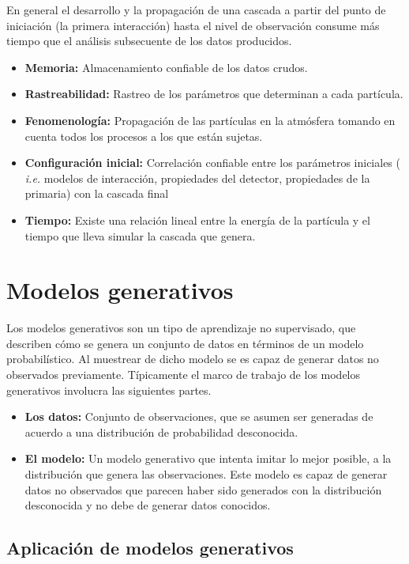 En general el desarrollo y la propagación de una cascada a partir del punto de iniciación (la primera interacción) hasta  el nivel de observación consume más tiempo que el análisis subsecuente de los datos producidos.

\begin{itemize}
    \item \textbf{Memoria:} Almacenamiento confiable de los datos crudos.
    \item \textbf{Rastreabilidad:} Rastreo de los parámetros que determinan a cada partícula.
    \item \textbf{Fenomenología:} Propagación de las partículas en la atmósfera tomando en cuenta todos los procesos a los que están sujetas.
    \item \textbf{Configuración inicial:} Correlación confiable entre los parámetros iniciales ( \emph{i.e.} modelos de interacción, propiedades del detector, propiedades de la primaria) con la cascada final
    \item \textbf{Tiempo:} Existe una relación lineal entre la energía de la partícula y el tiempo que lleva simular la cascada que genera.
\end{itemize}

\section{Modelos generativos}

Los modelos generativos son un tipo de aprendizaje no supervisado, que describen cómo se genera un conjunto de datos en términos de un modelo probabilístico. Al muestrear de dicho modelo se es capaz de generar datos no observados previamente. Típicamente el marco de trabajo de los modelos generativos involucra las siguientes partes.

\begin{itemize}
    \item \textbf{Los datos:} Conjunto de observaciones, que se asumen ser generadas de acuerdo a una distribución de probabilidad desconocida.
    \item \textbf{El modelo:} Un modelo generativo que intenta imitar lo mejor posible, a la distribución que genera las observaciones. Este modelo es capaz de generar datos no observados que parecen haber sido generados con la distribución desconocida y no debe de generar datos conocidos.
\end{itemize}

\subsection{Aplicación de modelos generativos}

